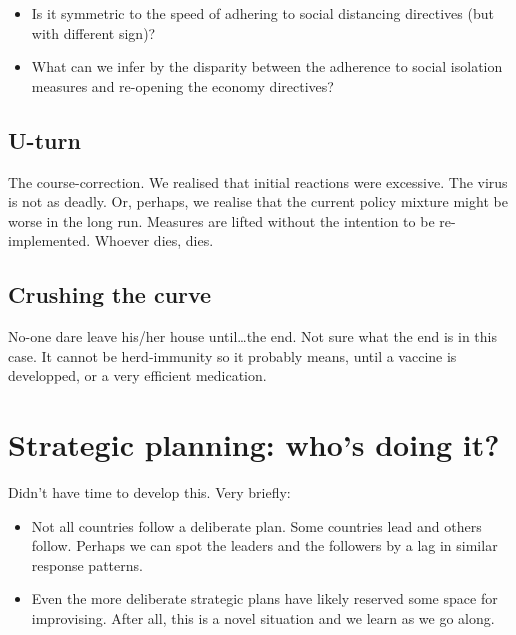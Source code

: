 \documentclass[
  english,
  ,doc,floatsintext]{apa6}
\providecommand{\tightlist}{%
  \setlength{\itemsep}{0pt}\setlength{\parskip}{0pt}}
\begin{document}
\begin{itemize}
\tightlist
\item
  Is it symmetric to the speed of adhering to social distancing directives (but with different sign)?
\item
  What can we infer by the disparity between the adherence to social isolation measures and re-opening the economy directives?
\end{itemize}

\hypertarget{u-turn}{%
\subsection{U-turn}\label{u-turn}}

The course-correction. We realised that initial reactions were excessive. The virus is not as deadly. Or, perhaps, we realise that the current policy mixture might be worse in the long run. Measures are lifted without the intention to be re-implemented. Whoever dies, dies.

\hypertarget{crushing-the-curve}{%
\subsection{Crushing the curve}\label{crushing-the-curve}}

No-one dare leave his/her house until\ldots the end. Not sure what the end is in this case. It cannot be herd-immunity so it probably means, until a vaccine is developped, or a very efficient medication.

\hypertarget{strategic-planning-whos-doing-it}{%
\section{Strategic planning: who's doing it?}\label{strategic-planning-whos-doing-it}}

Didn't have time to develop this. Very briefly:

\begin{itemize}
\tightlist
\item
  Not all countries follow a deliberate plan. Some countries lead and others follow. Perhaps we can spot the leaders and the followers by a lag in similar response patterns.
\item
  Even the more deliberate strategic plans have likely reserved some space for improvising. After all, this is a novel situation and we learn as we go along.
\end{itemize}
\end{document}
